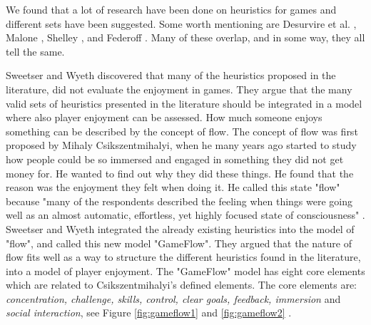 We found that a lot of research have been done on heuristics for games and different sets have been suggested. Some worth mentioning are Desurvire et al. \cite{desurvire}, Malone \cite{malone}, Shelley \cite{shelley}, and Federoff \cite{federoff}. Many of these overlap, and in some way, they all tell the same. 

Sweetser and Wyeth discovered that many of the heuristics proposed in the literature, did not evaluate the enjoyment in games. They argue that the many valid sets of heuristics presented in the literature should be integrated in a model where also player enjoyment can be assessed. How much someone enjoys something can be described by the concept of flow. The concept of flow was first proposed by  Mihaly Csikszentmihalyi, when he many years ago started  to study how people could be so immersed and engaged in something they did not get money for. He wanted to find out why they did these things. He found that the reason was the enjoyment they felt when doing it. He called this state "flow" because "many of the respondents described the feeling when things were going well as an almost automatic, effortless, yet highly focused state of consciousness" \cite{flow}.  Sweetser and Wyeth integrated the already existing heuristics into the model of "flow", and called this new model "GameFlow".  They argued that the nature of flow fits well as a way to structure the different heuristics found in the literature, into a model of player enjoyment. The "GameFlow" model has eight core elements which are related to Csikszentmihalyi's defined elements. The core elements are: \emph{concentration, challenge, skills, control, clear goals, feedback, immersion} and \emph{social interaction}, see Figure \ref{fig:gameflow1} and \ref{fig:gameflow2} \cite{sweetser}. 


